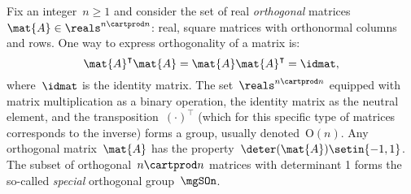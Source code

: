
\begin{example}

    Fix an integer~$n\geq 1$ and consider the set of real \emph{orthogonal} matrices~$\mat{A}\in \reals^{n\cartprod n}$:
   real, square matrices with orthonormal columns and rows.
    One way to express orthogonality of a matrix is:
    \begin{equation*}
        \mat{A}^\intercal \mat{A}=\mat{A}\mat{A}^\intercal = \idmat,
    \end{equation*}
    where~$\idmat$ is the identity matrix.
    The set~$\reals^{n\cartprod n}$ equipped with matrix multiplication as a binary operation, the identity matrix as the neutral element, and the transposition~$(\cdot)^\intercal$ (which for this specific type of matrices corresponds to the inverse) forms a group, usually denoted~$\text{O}(n)$.
    Any orthogonal matrix~$\mat{A}$ has the property~$\deter(\mat{A})\setin \{-1,1\}$.
    The subset of orthogonal~$n\cartprod n$ matrices with determinant 1 forms the so-called \emph{special} orthogonal group~$\mgSOn$.
\end{example}

